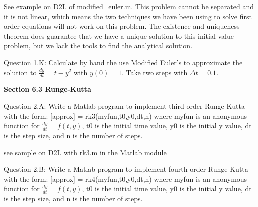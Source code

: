 \documentclass{article}
\def\ds{\displaystyle}
\begin{document}
{\color{teal} See example on D2L of modified\_euler.m. This problem cannot be separated and it is not linear, which means the two techniques we have been using to solve first order equations will not work on this problem. The existence and uniqueness theorem does guarantee that we have a unique solution to this initial value problem, but we lack the tools to find the analytical solution. }
\par \medskip \noindent
Question 1.K: Calculate by hand the use Modified Euler's to approximate the solution to $\ds \frac {dy}{dt}=t-y^2$ with $y(0)=1$. Take two steps with $\ds \Delta t = 0.1$.
\par \bigskip \par
{\bf Section 6.3 Runge-Kutta} \\
\medskip \par \noindent
%
Question 2.A: Write a Matlab program to implement third order Runge-Kutta with the form: [approx] = rk3(myfun,t0,y0,dt,n) where myfun is an anonymous function for $\ds \frac {dy}{dt}=f(t,y)$, t0 is the initial time value, y0 is the initial y value, dt is the step size, and n is the number of steps. 

{\color{teal} see sample on D2L with rk3.m in the Matlab module}

 \medskip \par \noindent
%
Question 2.B: Write a Matlab program to implement fourth order Runge-Kutta with the form: [approx] = rk4(myfun,t0,y0,dt,n) where myfun is an anonymous function for $\ds \frac {dy}{dt}=f(t,y)$, t0 is the initial time value, y0 is the initial y value, dt is the step size, and n is the number of steps. 
\end{document}
